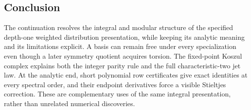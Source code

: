 \subsection{Conclusion}
The continuation resolves the integral and modular structure of the
specified depth-one weighted distribution presentation, while keeping
its analytic meaning and its limitations explicit. A basis can remain
free under every specialization even though a later symmetry quotient
acquires torsion. The fixed-point Koszul complex explains both the
integer parity rule and the full characteristic-two jet law. At the
analytic end, short polynomial row certificates give exact identities
at every spectral order, and their endpoint derivatives force a visible
Stieltjes correction. These are complementary uses of the same
integral presentation, rather than unrelated numerical discoveries.

